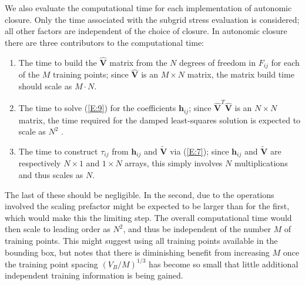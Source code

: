 We also evaluate the computational time for each implementation of autonomic closure. Only the time associated with the subgrid stress evaluation is considered; all other factors are independent of the choice of closure. In autonomic closure there are three contributors to the computational time:  
%
\begin{enumerate} 
	\item{The time to build the $\widehat{\mathbf{V}}$  matrix from the $N$ degrees of freedom in $F_{ij}$  for each of the $M$ training points; since  $\widehat{\mathbf{V}}$ is an  $M \times N$ matrix, the matrix build time should scale as $M \cdot N$.}
	\item{The time to solve (\ref{E:9}) for the coefficients $\mathbf{h}_{ij}$; since $\widehat{\mathbf{V}}^{T} \widehat{\mathbf{V}}$   is an $N \times N$  matrix, the time required for the damped least-squares solution is expected to scale as $N^2$ .}
	\item{The time to construct  $\tau_{ij}$ from  $\mathbf{h}_{ij}$ and  $\widetilde{\mathbf{V}}$ via (\ref{E:7}); since  $\mathbf{h}_{ij}$ and  $\widetilde{\mathbf{V}}$  are respectively $N \times 1$  and $1 \times N$  arrays, this simply involves $N$ multiplications and thus scales as $N$.}
\end{enumerate}
%
%
The last of these should be negligible. In the second, due to the operations involved the scaling prefactor might be expected to be larger than for the first, which would make this the limiting step. The overall computational time would then scale to leading order as $N^2$, and thus be independent of the number $M$ of training points. This might suggest using all training points available in the bounding box, but  notes that there is diminishing benefit from increasing $M$ once the training point spacing  $(V_B/M)^{1/3}$ has become so small that little additional independent training information is being gained.  

